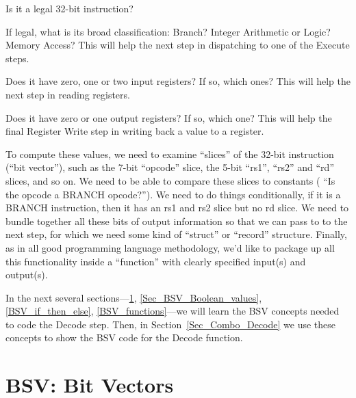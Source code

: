 \begin{tightlist}

 \item Is it a legal 32-bit instruction?

 \item If legal, what is its broad classification: Branch? Integer
   Arithmetic or Logic? Memory Access?  This will help the next step
   in dispatching to one of the Execute steps.

 \item Does it have zero, one or two input registers?  If so, which
   ones?  This will help the next step in reading registers.

 \item Does it have zero or one output registers?  If so, which one?
   This will help the final Register Write step in writing back a
   value to a register.

\end{tightlist}

To compute these values, we need to examine ``slices'' of the 32-bit
instruction (``bit vector''), such as the 7-bit ``opcode'' slice, the
5-bit ``rs1'', ``rs2'' and ``rd'' slices, and so on.  We need to be
able to compare these slices to constants ({\eg} ``Is the opcode a
BRANCH opcode?'').  We need to do things conditionally, {\eg} if it is
a BRANCH instruction, then it has an rs1 and rs2 slice but no rd
slice.  We need to bundle together all these bits of output
information so that we can pass to to the next step, for which we need
some kind of ``struct'' or ``record'' structure.  Finally, as in all
good programming language methodology, we'd like to package up all
this functionality inside a ``function'' with clearly specified
input(s) and output(s).

In the next several sections---\ref{Sec_BSV_Bit_Vectors},
\ref{Sec_BSV_Boolean_values}, \ref{BSV_if_then_else},
\ref{BSV_functions}---we will learn the BSV concepts needed to code
the Decode step.  Then, in Section~\ref{Sec_Combo_Decode} we use these
concepts to show the BSV code for the Decode function.


\section{BSV: Bit Vectors}

\label{Sec_BSV_Bit_Vectors}


